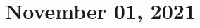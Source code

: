 \documentclass[class=scrartcl]{standalone}
\begin{document}
\chapter{November 01, 2021}
\end{document}

